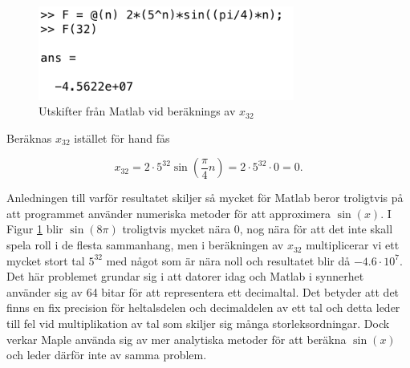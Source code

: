 \documentclass[a4paper]{article}
\begin{document}
\begin{figure}[h!]
	\centering
	\includegraphics[width=0.75\textwidth]{matlab.png}
	\caption{Utskifter från Matlab vid beräknings av $x_{32}$}
	\label{fig:matlab}
\end{figure}

Beräknas $x_{32}$ istället för hand fås

\begin{equation*}
	x_{32} = 2\cdot5^{32}\sin\left(\frac{\pi}{4}n\right) = 2\cdot5^{32}\cdot 0 = 0.
\end{equation*}

Anledningen till varför resultatet skiljer så mycket för Matlab beror troligtvis på att programmet använder numeriska metoder för att approximera $\sin(x)$. I Figur \ref{fig:matlab} blir $\sin(8\pi)$ troligtvis mycket nära $0$, nog nära för att det inte skall spela roll i de flesta sammanhang, men i beräkningen av $x_{32}$ multiplicerar vi ett mycket stort tal $5^{32}$ med något som är nära noll och resultatet blir då $-4.6\cdot10^7$. Det här problemet grundar sig i att datorer idag och Matlab i synnerhet använder sig av 64 bitar för att representera ett decimaltal. Det betyder att det finns en fix precision för heltalsdelen och decimaldelen av ett tal och detta leder till fel vid multiplikation av tal som skiljer sig många storleksordningar. Dock verkar Maple använda sig av mer analytiska metoder för att beräkna $\sin(x)$ och leder därför inte av samma problem.
\end{document}
